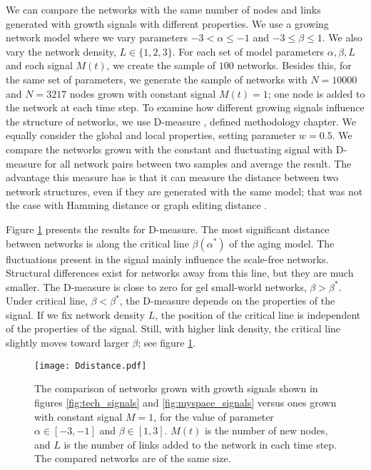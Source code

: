 We can compare the networks with the same number of nodes and links generated with growth signals with different properties. We use a growing network model where we vary parameters $-3<\alpha\leq-1$ and $-3\leq\beta\leq1$. We also vary the network density, $L\in\{1,2,3\}$. For each set of model parameters $\alpha, \beta, L$ and each signal $M(t)$, we create the sample of $100$ networks. Besides this, for the same set of parameters, we generate the sample of networks with $N=10000$ and $N=3217$ nodes grown with constant signal $M(t)=1$; one node is added to the network at each time step. To examine how different growing signals influence the structure of networks, we use D-measure \cite{tiago2}, defined methodology chapter. We equally consider the global and local properties, setting parameter $w=0.5$. We compare the networks grown with the constant and fluctuating signal with D-measure for all network pairs between two samples and average the result. The advantage this measure has is that it can measure the distance between two network structures, even if they are generated with the same model; that was not the case with Hamming distance or graph editing distance \cite{tiago2}.

Figure \ref{fig:dmeasure} presents the results for D-measure. The most significant distance between networks is along the critical line $\beta(\alpha^{*})$ of the aging model. The fluctuations present in the signal mainly influence the scale-free networks. Structural differences exist for networks away from this line, but they are much smaller. The D-measure is close to zero for gel small-world networks, $\beta>\beta^{*}$. Under critical line, $\beta<\beta^{*}$, the D-measure depends on the properties of the signal. If we fix network density $L$, the position of the critical line is independent of the properties of the signal. Still, with higher link density, the critical line slightly moves toward larger $\beta$; see figure \ref{fig:dmeasure}.

\begin{figure}[ht]
	\centering
	\texttt{[image: Ddistance.pdf]}
	\caption[D-measure for networks generated with real signals.]{The comparison of networks grown with growth signals shown in figures \ref{fig:tech_signals} and \ref{fig:myspace_signals} versus ones grown with constant signal $M=1$, for the value of parameter $\alpha\in[-3,-1]$ and $\beta\in[1,3]$. $M(t)$ is the number of new nodes, and $L$ is the number of links added to the network in each time step. The compared networks are of the same size.}
	\label{fig:dmeasure}
\end{figure}

